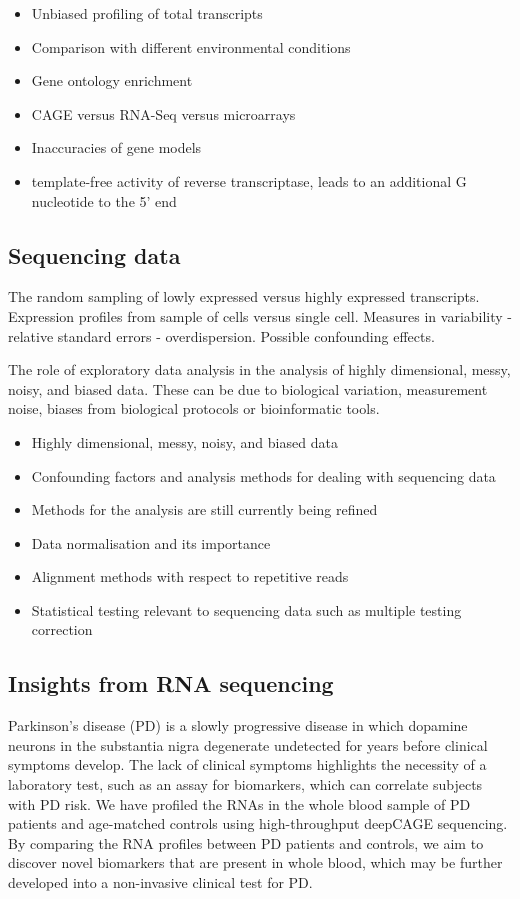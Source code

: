 \begin{itemize}
   \item Unbiased profiling of total transcripts
   \item Comparison with different environmental conditions
   \item Gene ontology enrichment
   \item CAGE versus RNA-Seq versus microarrays\cite{pmid24676093}
   \item Inaccuracies of gene models
   \item template-free activity of reverse transcriptase, leads to an additional G nucleotide to the 5' end
\end{itemize}

\subsection{Sequencing data}

The random sampling of lowly expressed versus highly expressed transcripts. Expression profiles from sample of cells versus single cell. Measures in variability - relative standard errors - overdispersion. Possible confounding effects.

The role of exploratory data analysis in the analysis of highly dimensional, messy, noisy, and biased data. These can be due to biological variation, measurement noise, biases from biological protocols or bioinformatic tools.

\begin{itemize}
   \item Highly dimensional, messy, noisy, and biased data
   \item Confounding factors and analysis methods for dealing with sequencing data
   \item Methods for the analysis are still currently being refined
   \item Data normalisation and its importance
   \item Alignment methods with respect to repetitive reads
   \item Statistical testing relevant to sequencing data such as multiple testing correction
\end{itemize}

\subsection{Insights from RNA sequencing}

Parkinson’s disease (PD) is a slowly progressive disease in which dopamine neurons in the substantia nigra degenerate undetected for years before clinical symptoms develop. The lack of clinical symptoms highlights the necessity of a laboratory test, such as an assay for biomarkers, which can correlate subjects with PD risk. We have profiled the RNAs in the whole blood sample of PD patients and age-matched controls using high-throughput deepCAGE sequencing. By comparing the RNA profiles between PD patients and controls, we aim to discover novel biomarkers that are present in whole blood, which may be further developed into a non-invasive clinical test for PD.

